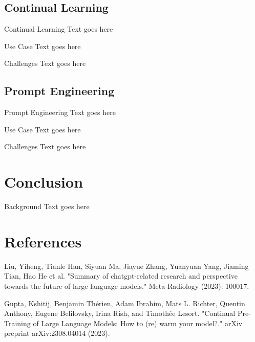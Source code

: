 \documentclass[t]{beamer}
\begin{document}
\subsection{Continual Learning}
\begin{frame}{Continual Learning}
  Text goes here
\end{frame}

\begin{frame}{Use Case}
  Text goes here
\end{frame}

\begin{frame}{Challenges}
  Text goes here
\end{frame}

\subsection{Prompt Engineering}
\begin{frame}{Prompt Engineering}
  Text goes here
\end{frame}

\begin{frame}{Use Case}
  Text goes here
\end{frame}

\begin{frame}{Challenges}
  Text goes here
\end{frame}

\section{Conclusion}
\begin{frame}{Background}
  Text goes here
\end{frame}

\section{References}
\begin{frame}{}
\begin{thebibliography}{}
  Liu, Yiheng, Tianle Han, Siyuan Ma, Jiayue Zhang, Yuanyuan Yang, Jiaming Tian, Hao He et al. "Summary of chatgpt-related research and perspective towards the future of large language models." Meta-Radiology (2023): 100017.

  Gupta, Kshitij, Benjamin Thérien, Adam Ibrahim, Mats L. Richter, Quentin Anthony, Eugene Belilovsky, Irina Rish, and Timothée Lesort. "Continual Pre-Training of Large Language Models: How to (re) warm your model?." arXiv preprint arXiv:2308.04014 (2023).
\end{thebibliography}
\end{frame}
\end{document}
